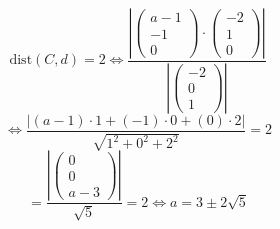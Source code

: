\documentclass{article}
\begin{document}
\[ \text{dist}(C,d) = 2 \Leftrightarrow \frac{\left|\begin{pmatrix} a-1 \\ -1 \\ 0 \end{pmatrix} \cdot \begin{pmatrix} -2 \\ 1 \\ 0 \end{pmatrix}\right|}{\left|\begin{pmatrix} -2 \\ 0 \\ 1 \end{pmatrix}\right|} \]
\[ \Leftrightarrow \frac{|(a-1) \cdot 1 + (-1) \cdot 0 + (0) \cdot 2|}{\sqrt{1^2 + 0^2 + 2^2}} = 2 \]
\[ = \frac{\left| \begin{pmatrix} 0 \\ 0 \\ a-3 \end{pmatrix} \right|}{\sqrt{5}} = 2 \Leftrightarrow a = 3 \pm 2\sqrt{5} \]
\end{document}
